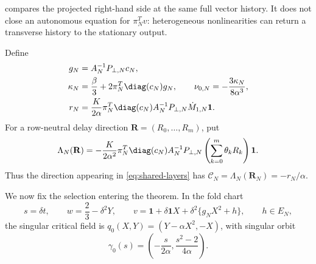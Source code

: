  compares the projected right-hand side at the
same full vector history.  It does not close an autonomous equation for
\(\pi_N^T v\): heterogeneous nonlinearities can return a transverse history
to the stationary output.

Define
\begin{align}
 g_N&=A_N^{-1}P_{\perp,N}c_N,\notag\\
 \kappa_N&=\frac\beta3+2\pi_N^T\diag(c_N)g_N,\qquad
 \nu_{0,N}=-\frac{3\kappa_N}{8\alpha^3},             \label{eq:shared-center}\\
 r_N&=\frac{K}{2\alpha}\pi_N^T\diag(c_N)
 A_N^{-1}P_{\perp,N}\dot M_{1,N}\mathbf1.            \label{eq:shared-rn}
\end{align}
For a row-neutral delay direction
\(\mathbf R=(R_0,\ldots,R_m)\), put
\begin{equation}
 \Lambda_N(\mathbf R)
 =-\frac{K}{2\alpha^2}\pi_N^T\diag(c_N)
 A_N^{-1}P_{\perp,N}
 \left(\sum_{k=0}^m\theta_kR_k\right)\mathbf1.
                                                               \label{eq:response-functional}
\end{equation}
Thus the direction appearing in \cref{eq:shared-layers} has
\(\mathscr C_N=\Lambda_N(\mathbf R_N)=-r_N/\alpha\).

We now fix the selection entering the theorem.  In the fold chart
\[
 s=\delta t,\qquad w=\frac23-\delta^2Y,\qquad
 v=\mathbf1+\delta\mathbf1X
       +\delta^2\{g_NX^2+h\},\qquad h\in E_N,
\]
the singular critical field is
\(q_0(X,Y)=(Y-\alpha X^2,-X)\), with singular orbit
\[
 \gamma_0(s)=\left(-\frac{s}{2\alpha},
                    \frac{s^2-2}{4\alpha}\right).
\]

